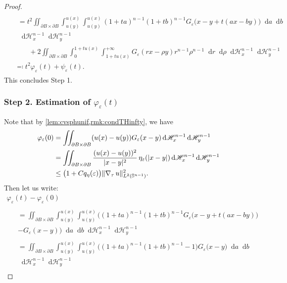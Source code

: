 \documentclass[JEP,XML,SOM,Unicode,published]{cedram}
\numberwithin{equation}{section}
\theoremstyle{plain}
\theoremstyle{definition}
\newcommand{\dd}{\mathop{}\mathopen{}\mathrm{d}}
\newcommand{\da}{\mathop{}\mathopen{}\mathrm{d}a}
\newcommand{\db}{\mathop{}\mathopen{}\mathrm{d}b}
\newcommand{\dr}{\mathop{}\mathopen{}\mathrm{d}r}
\newcommand{\dH}{\mathop{}\mathopen{}\mathrm{d}\mathscr{H}}
\newcommand{\bbS}{\mathbb{S}}
\let\eps\varepsilon
\let\vphi\varphi
\newcommand{\grad}{\nabla}
\DeclarePairedDelimiter{\abs}{\lvert}{\rvert}
\DeclarePairedDelimiter{\norm}{\lVert}{\rVert}
\begin{document}
\begin{proof}
\begin{multline}
\begin{aligned}
&\begin{multlined}
=t^2\iint_{\partial B\times\partial B} \int_{u(y)}^{u(x)}\int_{u(y)}^{u(x)}
(1+ta)^{n-1}(1+tb)^{n-1}G_\eps\big(x-y+t(ax-by)\big)\da\db\\[-5pt]
\dH_x^{n-1}\dH_y^{n-1}
\end{multlined}
\\
&\qquad
+2\iint_{\partial B\times\partial B}\int_0^{1+tu(x)} \int_{1+tu(x)}^{+\infty} G_\eps(rx-\rho
y)r^{n-1}\rho^{n-1}\dr\dd\rho\dH^{n-1}_x\dH^{n-1}_y\\
&\eqqcolon t^2 \vphi_\eps(t)+\psi_\eps(t).
\end{aligned}
\end{multline}
This concludes Step 1.

\subsubsection*{Step 2. Estimation of $\vphi_\eps(t)$}
Note that by \cref{lem:cvsphunif,rmk:condTHinfty}, we have
\begin{equation}\label{fuglede:eq2}
\begin{aligned}
\vphi_\eps(0)
&=\iint_{\partial B\times\partial B} (u(x)-u(y))G_\eps(x-y)\dH_x^{n-1}\dH_y^{n-1}\\
&=\iint_{\partial B\times\partial B} \frac{(u(x)-u(y))^2}{\abs{x-y}^2}\,\eta_\eps(\abs{x-y})
\dH_x^{n-1}\dH_y^{n-1}\\
&\leq \big(1+Cq_\eta(\eps)\big)\norm{\grad_\tau\,u}_{L^2(\bbS^{n-1})}^2.
\end{aligned}
\end{equation}
Then let us write:\vspace*{-5pt}
\begin{multline}\label{fuglede:eq3}
\vphi_\eps(t)-\vphi_\eps(0)\\
\begin{aligned}
&\begin{multlined}=\iint_{\partial B\times\partial B} \int_{u(y)}^{u(x)}\int_{u(y)}^{u(x)}
\Big((1+ta)^{n-1}(1+tb)^{n-1}G_\eps\big(x-y+t(ax-by)\big)\\
-G_\eps(x-y)\Big)\da\db\dH_x^{n-1}\dH_y^{n-1}\end{multlined}\\
&\begin{multlined}
=\iint_{\partial B\times\partial B} \int_{u(y)}^{u(x)}\int_{u(y)}^{u(x)}
\Big((1+ta)^{n-1}(1+tb)^{n-1}-1\Big)G_\eps\big(x-y\big)\da\db\\\dH_x^{n-1}\dH_y^{n-1}

\end{multlined}
\end{aligned}
\end{multline}
\end{proof}
\end{document}
